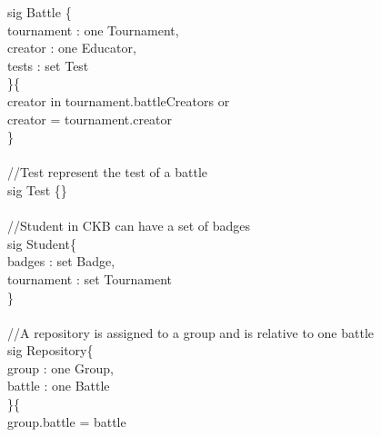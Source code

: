 \documentclass{article}
\begin{document}
{    \color{blue}
    sig 
    \color{black}
    Battle \{\\
	\-\hspace{1cm}    tournament : \color{blue} one \color{black} Tournament,\\
	\-\hspace{1cm}    creator : \color{blue} one \color{black} Educator,\\
    \-\hspace{1cm}	tests : \color{blue} set \color{black} Test\\
    \}\{\\
    \-\hspace{1cm}	creator \color{blue} in \color{black} tournament.battleCreators \color{blue} or \color{black}\\
    \-\hspace{1cm}	creator \color{blue} = \color{black} tournament.creator\\
    \}\\
    \color{gray}
    \\    
    //Test represent the test of a battle\\
    \color{blue}
    sig 
    \color{black}
    Test \{\}\\
    \color{gray}
    \\
    //Student in CKB can have a set of badges\\
    \color{blue}
    sig 
    \color{black}
    Student\{\\
	\-\hspace{1cm}    badges : \color{blue} set \color{black} Badge,\\
	\-\hspace{1cm}    tournament : \color{blue} set \color{black} Tournament\\
    \}\\
    \color{gray}
    \\
    //A repository is assigned to a group and is relative to one battle\\
    \color{blue}
    sig 
    \color{black}
    Repository\{\\
	\-\hspace{1cm}    group : \color{blue} one \color{black} Group,\\
	\-\hspace{1cm}    battle : \color{blue} one \color{black} Battle\\
    \}\{\\
	\-\hspace{1cm}    group.battle \color{blue} = \color{black} battle\\
}
\end{document}
